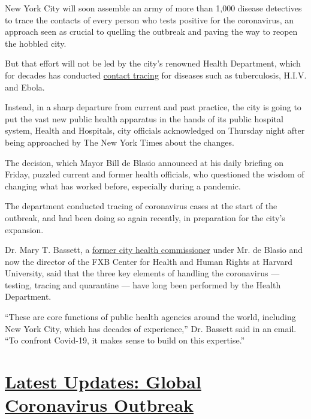 New York City will soon assemble an army of more than 1,000 disease
detectives to trace the contacts of every person who tests positive for
the coronavirus, an approach seen as crucial to quelling the outbreak
and paving the way to reopen the hobbled city.

But that effort will not be led by the city's renowned Health
Department, which for decades has conducted
\href{https://www.nytimes.com/2020/06/21/nyregion/nyc-contact-tracing.html}{contact
tracing} for diseases such as tuberculosis, H.I.V. and Ebola.

Instead, in a sharp departure from current and past practice, the city
is going to put the vast new public health apparatus in the hands of its
public hospital system, Health and Hospitals, city officials
acknowledged on Thursday night after being approached by The New York
Times about the changes.

The decision, which Mayor Bill de Blasio announced at his daily briefing
on Friday, puzzled current and former health officials, who questioned
the wisdom of changing what has worked before, especially during a
pandemic.

The department conducted tracing of coronavirus cases at the start of
the outbreak, and had been doing so again recently, in preparation for
the city's expansion.

Dr. Mary T. Bassett, a
\href{https://www.nytimes.com/2018/08/02/nyregion/nyc-health-mary-bassett-resignation.html}{former
city health commissioner} under Mr. de Blasio and now the director of
the FXB Center for Health and Human Rights at Harvard University, said
that the three key elements of handling the coronavirus --- testing,
tracing and quarantine --- have long been performed by the Health
Department.

``These are core functions of public health agencies around the world,
including New York City, which has decades of experience,'' Dr. Bassett
said in an email. ``To confront Covid-19, it makes sense to build on
this expertise.''

\hypertarget{latest-updates-global-coronavirus-outbreak}{%
\section{\texorpdfstring{\href{https://www.nytimes.com/2020/08/04/world/coronavirus-covid-19.html?action=click\&pgtype=Article\&state=default\&region=MAIN_CONTENT_1\&context=storylines_live_updates}{Latest
Updates: Global Coronavirus
Outbreak}}{Latest Updates: Global Coronavirus Outbreak}}\label{latest-updates-global-coronavirus-outbreak}}

